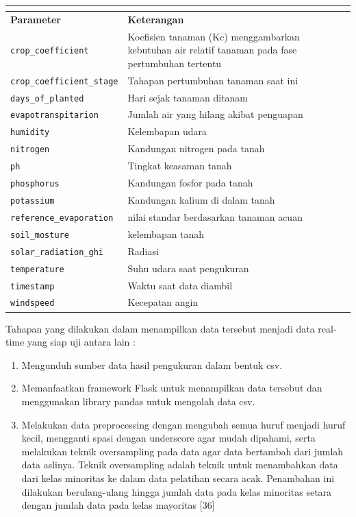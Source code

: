\begin{enumerate}[label={\alph*.}]
\begin{longtable}{|p{.35\linewidth}|p{.60\linewidth}|}
{		} \\ \hline
		\textbf{Parameter} & \textbf{Keterangan} \\ \hline
		\texttt{crop\_coefficient} & Koefisien tanaman (Kc) menggambarkan kebutuhan air relatif tanaman pada fase pertumbuhan tertentu \\ \hline
		\texttt{crop\_coefficient\_stage} & Tahapan pertumbuhan tanaman saat ini \\ \hline
		\texttt{days\_of\_planted} & Hari sejak tanaman ditanam \\ \hline
		\texttt{evapotranspitarion} & Jumlah air yang hilang akibat penguapan \\ \hline
		\texttt{humidity} & Kelembapan udara \\ \hline
		\texttt{nitrogen} & Kandungan nitrogen pada tanah \\ \hline
		\texttt{ph} & Tingkat keasaman tanah \\ \hline
		\texttt{phosphorus} & Kandungan fosfor pada tanah \\ \hline
		\texttt{potassium} & Kandungan kalium di dalam tanah \\ \hline
		\texttt{reference\_evaporation} & nilai standar berdasarkan tanaman acuan\\ \hline
		\texttt{soil\_mosture} & kelembapan tanah \\ \hline
		\texttt{solar\_radiation\_ghi} & Radiasi\\ \hline
		\texttt{temperature} & Suhu udara saat pengukuran \\ \hline
		\texttt{timestamp} & Waktu saat data diambil \\ \hline
		\texttt{windspeed} & Kecepatan angin \\ \hline
	\end{longtable}
	Tahapan yang dilakukan dalam menampilkan data tersebut menjadi data real-time yang siap uji antara lain : 
	\begin{enumerate}[label={\arabic*.}]
		\item Mengunduh sumber data hasil pengukuran dalam bentuk csv. 
		\item Memanfaatkan framework Flask untuk menampilkan data tersebut dan menggunakan library pandas untuk mengolah data csv.
		\item Melakukan data preprocessing dengan mengubah semua huruf menjadi huruf kecil, mengganti spasi dengan underscore agar mudah dipahami, serta melakukan teknik oversampling pada data agar data bertambah dari jumlah data aslinya. Teknik oversampling adalah teknik untuk menambahkan data dari kelas minoritas ke dalam data pelatihan secara acak. Penambahan ini dilakukan berulang-ulang hingga jumlah data pada kelas minoritas setara dengan jumlah data pada kelas mayoritas [36]

\end{enumerate}
\end{enumerate}
